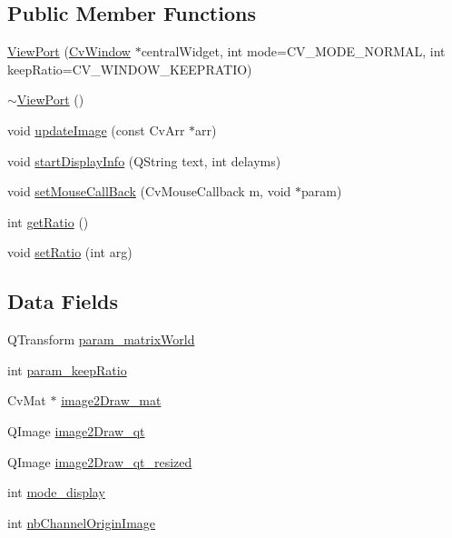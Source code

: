 \subsection*{Public Member Functions}
\begin{DoxyCompactItemize}
\item 
\hyperlink{classViewPort_ae986eca6567919eccfa84fa11d152519}{ViewPort} (\hyperlink{classCvWindow}{CvWindow} $\ast$centralWidget, int mode=CV\_\-MODE\_\-NORMAL, int keepRatio=CV\_\-WINDOW\_\-KEEPRATIO)
\item 
\hyperlink{classViewPort_aa9e30578206a4c74b8e3e0bf1cbed5a1}{$\sim$ViewPort} ()
\item 
void \hyperlink{classViewPort_a19c83263889430a83e5f9d1aaee4741b}{updateImage} (const CvArr $\ast$arr)
\item 
void \hyperlink{classViewPort_a2618b2c40f1770ab153cbae4da9c5313}{startDisplayInfo} (QString text, int delayms)
\item 
void \hyperlink{classViewPort_a725688baa203c6247e9a147acaa7597a}{setMouseCallBack} (CvMouseCallback m, void $\ast$param)
\item 
int \hyperlink{classViewPort_a969eb1a036822f1f500dd832c1f45d11}{getRatio} ()
\item 
void \hyperlink{classViewPort_ad250b6cf4dd6d571128a7ad0d4d98175}{setRatio} (int arg)
\end{DoxyCompactItemize}
\subsection*{Data Fields}
\begin{DoxyCompactItemize}
\item 
QTransform \hyperlink{classViewPort_a4404db6e34a91d2e2e4c5026840a2adc}{param\_\-matrixWorld}
\item 
int \hyperlink{classViewPort_a2ad627e7c8f030da5b252cfbb056164b}{param\_\-keepRatio}
\item 
CvMat $\ast$ \hyperlink{classViewPort_af6a3576406241b379379cc6d1a6d0c4f}{image2Draw\_\-mat}
\item 
QImage \hyperlink{classViewPort_affb4d66105d8c57b62a8d1ca3a2f2aae}{image2Draw\_\-qt}
\item 
QImage \hyperlink{classViewPort_a69c446903d67c1e328c8398341c2da21}{image2Draw\_\-qt\_\-resized}
\item 
int \hyperlink{classViewPort_abdd3f74adf3deb4bc1808f669d8815a4}{mode\_\-display}
\item 
int \hyperlink{classViewPort_a023381fa2838df1c3ef3a9183f4abbd1}{nbChannelOriginImage}
\end{DoxyCompactItemize}


